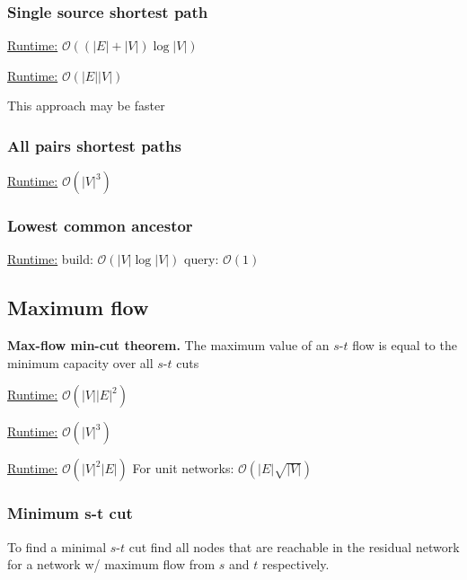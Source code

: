 \subsubsection{Single source shortest path}
\underline{Runtime:}
$\mathcal{O}((\lvert E \rvert + \lvert V \rvert )\log \lvert V
\rvert)$

\underline{Runtime:} $\mathcal{O}(\lvert E \rvert \lvert V \rvert)$

This approach may be faster
\subsubsection{All pairs shortest paths}
\underline{Runtime:} $\mathcal{O}(\lvert V \rvert^3)$

\subsubsection{Lowest common ancestor}
\underline{Runtime:} build: $\mathcal{O}(\lvert V \rvert \log \lvert
V\rvert)$ query: $\mathcal{O}(1)$

\subsection{Maximum flow}

\textbf{Max-flow min-cut theorem.} The maximum value of an $s$-$t$ flow is
equal to the minimum capacity over all $s$-$t$ cuts

\underline{Runtime:} $\mathcal{O}(\lvert V \rvert \lvert E \rvert^2)$

\underline{Runtime:} $\mathcal{O}(\left| V \right|^3)$

\underline{Runtime:} $\mathcal{O}(|V|^2|E|)$ For unit networks: $\mathcal{O}(|E|\sqrt{|V|})$

\subsubsection{Minimum s-t cut}

To find a minimal $s$-$t$ cut find all nodes that are reachable in the
residual network for a network w/ maximum flow from $s$ and $t$
respectively.

